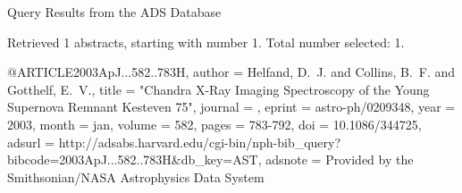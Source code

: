Query Results from the ADS Database


Retrieved 1 abstracts, starting with number 1.  Total number selected: 1.

@ARTICLE{2003ApJ...582..783H,
   author = {{Helfand}, D.~J. and {Collins}, B.~F. and {Gotthelf}, E.~V.},
    title = "{Chandra X-Ray Imaging Spectroscopy of the Young Supernova Remnant Kesteven 75}",
  journal = {\apj},
   eprint = {astro-ph/0209348},
     year = 2003,
    month = jan,
   volume = 582,
    pages = {783-792},
      doi = {10.1086/344725},
   adsurl = {http://adsabs.harvard.edu/cgi-bin/nph-bib_query?bibcode=2003ApJ...582..783H&db_key=AST},
  adsnote = {Provided by the Smithsonian/NASA Astrophysics Data System}
}


